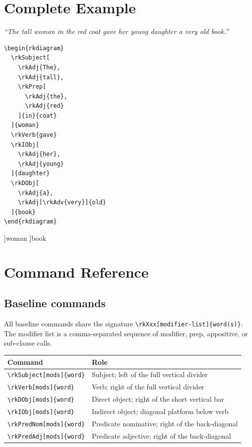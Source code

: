\documentclass[11pt]{article}
\newcommand{\cmd}[1]{\texttt{\textbackslash #1}}
\begin{document}
\section{Complete Example}

\textit{``The tall woman in the red coat gave her young daughter a very old book.''}

\medskip
\begin{lstlisting}
\begin{rkdiagram}
  \rkSubject[
    \rkAdj{The},
    \rkAdj{tall},
    \rkPrep[
      \rkAdj{the},
      \rkAdj{red}
    ]{in}{coat}
  ]{woman}
  \rkVerb{gave}
  \rkIObj[
    \rkAdj{her},
    \rkAdj{young}
  ]{daughter}
  \rkDObj[
    \rkAdj{a},
    \rkAdj[\rkAdv{very}]{old}
  ]{book}
\end{rkdiagram}
\end{lstlisting}

\medskip
\begin{rkdiagram}[spacing=1.3cm]
  \rkSubject[
    \rkAdj{The}, \rkAdj{tall},
    \rkPrep[\rkAdj{the}, \rkAdj{red}]{in}{coat}
  ]{woman}
  \rkDObj[\rkAdj{a}, \rkAdj[\rkAdv{very}]{old}]{book}
\end{rkdiagram}

\section{Command Reference}

\subsection*{Baseline commands}

All baseline commands share the signature \cmd{rkXxx[modifier-list]\{word(s)\}}.
The modifier list is a comma-separated sequence of modifier, prep, appositive, or sub-clause calls.

\medskip
\begin{tabular}{@{}p{7cm}p{8cm}@{}}
  \toprule
  Command & Role \\
  \midrule
  \cmd{rkSubject[mods]\{word\}}  & Subject; left of the full vertical divider \\
  \cmd{rkVerb[mods]\{word\}}     & Verb; right of the full vertical divider \\
  \cmd{rkDObj[mods]\{word\}}     & Direct object; right of the short vertical bar \\
  \cmd{rkIObj[mods]\{word\}}     & Indirect object; diagonal platform below verb \\
  \cmd{rkPredNom[mods]\{word\}}  & Predicate nominative; right of the back-diagonal \\
  \cmd{rkPredAdj[mods]\{word\}}  & Predicate adjective; right of the back-diagonal \\
  \bottomrule
\end{tabular}
\end{document}
